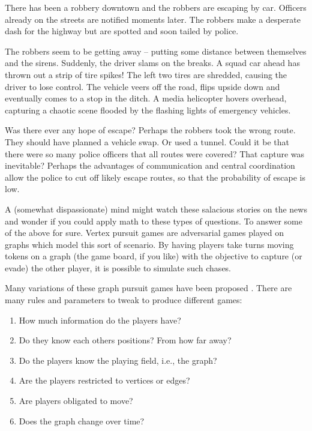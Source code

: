 There has been a robbery downtown and the robbers are escaping by car. Officers
already on the streets are notified moments later. The robbers make a desperate dash for the highway but are spotted and soon tailed by police.

The robbers seem to be getting away -- putting some distance between themselves and the sirens.
Suddenly, the driver slams on the breaks. A squad car ahead has thrown out a strip of tire spikes! The left two tires are shredded, causing the driver to lose control. The vehicle veers off the road, flips upside down and eventually comes to a stop in the ditch. A media helicopter hovers overhead, capturing
a chaotic scene flooded by the flashing lights of emergency vehicles.

Was there ever any hope of escape? Perhaps the robbers took the wrong route.
They should have planned a vehicle swap. Or used a tunnel. Could it be that there were
so many police officers that all routes were covered? That capture was inevitable?
Perhaps the advantages of communication and central coordination allow the police to
  cut off likely escape routes, so that the probability of escape is low.

A (somewhat dispassionate) mind might watch these salacious stories on the news and wonder
 if you could apply math to these types of questions. To answer some of the above for sure.
Vertex pursuit games are adversarial games played on graphs which model this sort
of scenario.
By having players take turns moving tokens on a graph (the game board, if you like) with
the objective to capture (or evade) the other player, it is possible to simulate such chases.

Many variations of these graph pursuit games have been proposed \cite{bonato2017graph, bellman1967graphs}. There are many rules and
parameters to tweak to produce different games:

\begin{enumerate}
\item How much information do the players have?
\item Do they know each others positions? From how far away?
\item Do the players know the playing field, i.e., the graph?
\item Are the players restricted to vertices or edges?
\item Are players obligated to move?
\item Does the graph change over time?
\end{enumerate}

